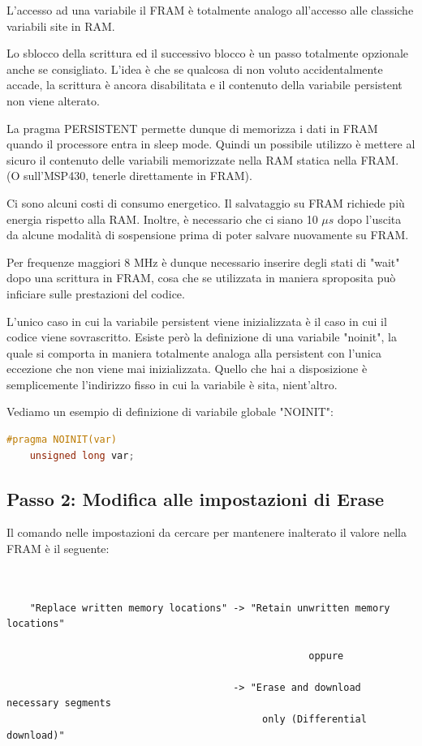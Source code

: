 \documentclass[LaM,binding=0.6cm]{../sapthesis}
\begin{document}
\clearpage
L'accesso ad una variabile il FRAM è totalmente analogo all'accesso alle classiche variabili site in RAM.

Lo sblocco della scrittura ed il successivo blocco è un passo totalmente opzionale anche se consigliato. L'idea è che se qualcosa di non voluto accidentalmente accade, la scrittura è ancora disabilitata e il contenuto della variabile persistent non viene alterato.

La pragma PERSISTENT permette dunque di memorizza i dati in FRAM quando il processore entra in sleep mode.
Quindi un possibile utilizzo è mettere al sicuro il contenuto delle variabili memorizzate nella RAM statica nella FRAM. (O sull'MSP430, tenerle direttamente in FRAM).

Ci sono alcuni costi di consumo energetico. Il salvataggio su FRAM richiede più energia rispetto alla RAM. Inoltre, è necessario che ci siano 10 $\mu s$ dopo l'uscita da alcune modalità di sospensione prima di poter salvare nuovamente su FRAM.

Per frequenze maggiori 8 MHz è dunque necessario inserire degli stati di "wait" dopo una scrittura in FRAM, cosa che se utilizzata in maniera sproposita può inficiare sulle prestazioni del codice.

L'unico caso in cui la variabile persistent viene inizializzata è il caso in cui il codice viene sovrascritto.
Esiste però la definizione di una variabile "noinit", la quale si comporta in maniera totalmente analoga alla persistent con
l'unica eccezione che non viene mai inizializzata.
Quello che hai a disposizione è semplicemente l'indirizzo fisso in cui la variabile è sita, nient'altro.

Vediamo un esempio di definizione di variabile globale "NOINIT":
\begin{lstlisting}[language=C]
    #pragma NOINIT(var)  
    unsigned long var;  
\end{lstlisting}

\subsection{Passo 2: Modifica alle impostazioni di Erase}
Il comando nelle impostazioni da cercare per mantenere inalterato il valore nella FRAM è il seguente:
\begin{verbatim}
    

    "Replace written memory locations" -> "Retain unwritten memory locations"
    
                                                    oppure
                                                    
                                       -> "Erase and download necessary segments 
                                            only (Differential download)"

\end{verbatim}
\end{document}
